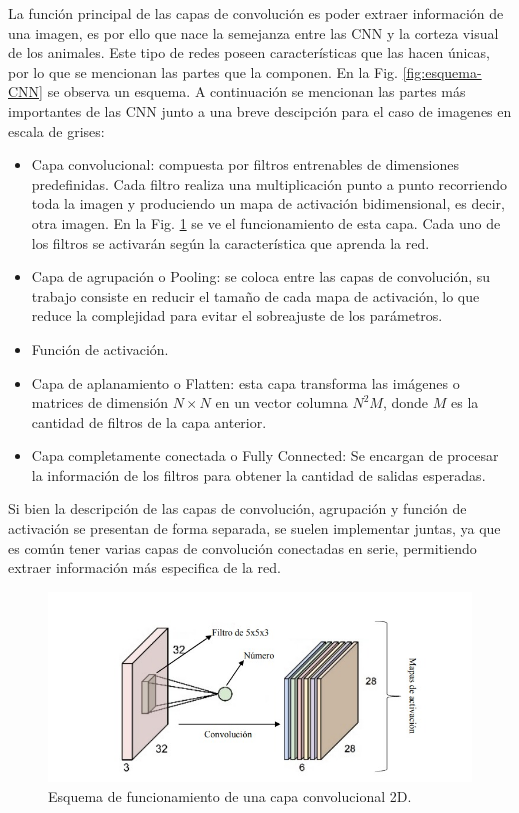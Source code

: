 La función principal de las capas de convolución es poder extraer información de una imagen, es por ello que nace la semejanza entre las CNN y la corteza visual de los animales.
Este tipo de redes poseen características que las hacen únicas, por lo que se mencionan las partes que la componen.
En la Fig. \ref{fig:esquema-CNN} se observa un esquema.
A continuación se mencionan las partes más importantes de las CNN junto a una breve descipción para el caso de imagenes en escala de grises:

\begin{itemize}
    \item Capa convolucional: compuesta por filtros entrenables de dimensiones predefinidas. Cada filtro realiza una multiplicación punto a punto recorriendo toda la imagen y produciendo un mapa de activación bidimensional, es decir, otra imagen.
          En la Fig. \ref{fig:esquema-capa-convolucional} se ve el funcionamiento de esta capa. Cada uno de los filtros se activarán según la característica que aprenda la red.
    \item Capa de agrupación o Pooling: se coloca entre las capas de convolución, su trabajo consiste en reducir el tamaño de cada mapa de activación, lo que reduce la complejidad para evitar el sobreajuste de los parámetros.
    \item Función de activación.
    \item Capa de aplanamiento o Flatten: esta capa transforma las imágenes o matrices de dimensión $N \times N$ en un vector columna $N^2M$, donde $M$ es la cantidad de filtros de la capa anterior.
    \item Capa completamente conectada o Fully Connected: Se encargan de procesar la información de los filtros para obtener la cantidad de salidas esperadas.
\end{itemize}

Si bien la descripción de las capas de convolución, agrupación y función de activación se presentan de forma separada, se suelen implementar juntas, ya que es común tener varias capas de convolución conectadas en serie, permitiendo extraer información más especifica de la red.

\begin{figure}[bth]
    \centering
    \includegraphics[width=1\textwidth]{imgs/capa-convolucional.jpeg}
    \caption{Esquema de funcionamiento de una capa convolucional 2D.}
    \label{fig:esquema-capa-convolucional}
\end{figure}

